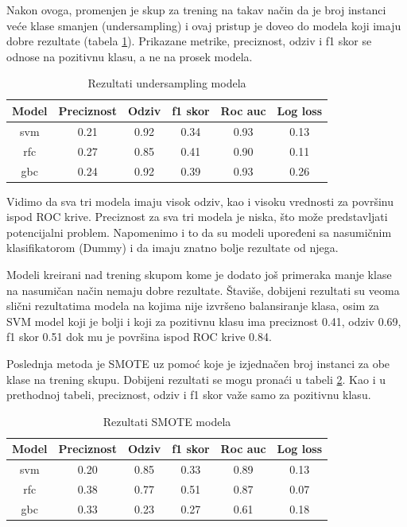 \documentclass[a4paper]{article}
\begin{document}
Nakon ovoga, promenjen je skup za trening na takav način da je broj instanci
veće klase smanjen (undersampling) i ovaj pristup je doveo do modela koji imaju dobre rezultate (tabela \ref{tab:undersampling_pg}). Prikazane metrike, preciznost, odziv i f1 skor se odnose na pozitivnu klasu, a ne na prosek modela.

\begin{table}[!h]
\begin{center}
\begin{tabular}{|c|c|c|c|c|c|} \hline
\textbf{Model} & \textbf{Preciznost} & \textbf{Odziv} & \textbf{f1 skor} & \textbf{Roc auc} & \textbf{Log loss} \\ \hline
svm & 0.21 & 0.92 & 0.34 & 0.93 & 0.13 \\ \hline
rfc & 0.27 & 0.85 & 0.41 & 0.90 & 0.11 \\ \hline
gbc & 0.24 & 0.92 & 0.39 & 0.93 & 0.26 \\ \hline
\end{tabular}
\caption{Rezultati undersampling modela}
\label{tab:undersampling_pg}
\end{center}
\end{table}

Vidimo da sva tri modela imaju visok odziv, kao i visoku vrednosti za površinu ispod ROC krive. Preciznost za sva tri modela je niska, što može predstavljati potencijalni problem. Napomenimo i to da su modeli upoređeni sa nasumičnim klasifikatorom (Dummy) i da imaju znatno bolje rezultate od njega.

Modeli kreirani nad trening skupom kome je dodato još primeraka manje
klase na nasumičan način nemaju dobre rezultate. Štaviše, dobijeni rezultati
su veoma slični rezultatima modela na kojima nije izvršeno balansiranje klasa,
osim za SVM model koji je bolji i koji za pozitivnu klasu ima preciznost 0.41,
odziv 0.69, f1 skor 0.51 dok mu je površina ispod ROC krive 0.84.

Poslednja metoda je SMOTE uz pomoć koje je izjednačen broj instanci za obe klase na
trening skupu. Dobijeni rezultati se mogu pronaći u tabeli \ref{tab:smote_pg}. Kao i u prethodnoj tabeli, preciznost, odziv i f1 skor važe samo za pozitivnu klasu.

\begin{table}[!h]
\begin{center}
\begin{tabular}{|c|c|c|c|c|c|} \hline
\textbf{Model} & \textbf{Preciznost} & \textbf{Odziv} & \textbf{f1 skor} & \textbf{Roc auc} & \textbf{Log loss} \\ \hline
svm & 0.20 & 0.85 & 0.33 & 0.89 & 0.13 \\ \hline
rfc & 0.38 & 0.77 & 0.51 & 0.87 & 0.07 \\ \hline
gbc & 0.33 & 0.23 & 0.27 & 0.61 & 0.18 \\ \hline
\end{tabular}
\caption{Rezultati SMOTE modela}
\label{tab:smote_pg}
\end{center}
\end{table}
\end{document}
